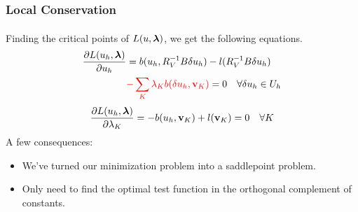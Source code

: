 \documentclass{beamer}
\begin{document}
\begin{frame}
\frametitle{Local Conservation}
Finding the critical points of $L(u,\boldsymbol\lambda)$, we get the following
equations\textsuperscript{\cite{EllisDemkowiczChan2013}}.
\begin{align*}
\frac{\partial L(u_h,\boldsymbol\lambda)}{\partial u_h}&=b(u_h,R_V^{-1}B\delta u_h)
-l(R_V^{-1}B\delta u_h)\\
&{\color{red}-\sum_K\lambda_K b(\delta
u_h,\mathbf{v}_K)}=0\quad\forall\delta u_h\in U_h
\end{align*}
\[
\frac{\partial
L(u_h,\boldsymbol\lambda)}{\partial\lambda_K}=-b(u_h,\mathbf{v}_K)+l(\mathbf{v}_K)=0\quad\forall
K
\]
A few consequences:
\begin{itemize}
\item We've turned our minimization problem into a saddlepoint problem.
\item Only need to find the optimal test function in the orthogonal complement
of constants. %
\end{itemize}
\end{frame}

\end{document}
